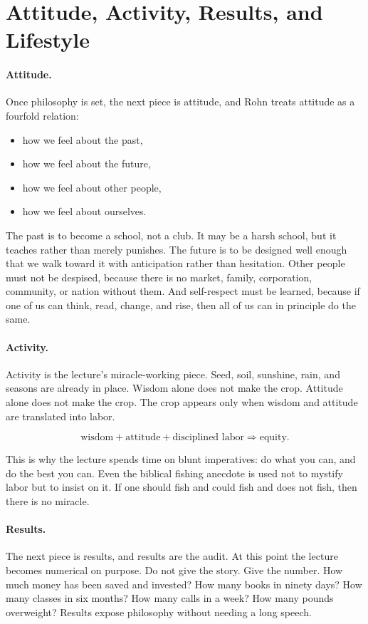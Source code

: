 \section{Attitude, Activity, Results, and Lifestyle}

\paragraph{Attitude.}
Once philosophy is set, the next piece is attitude, and Rohn treats attitude as a fourfold relation:

\begin{itemize}
\item how we feel about the past,
\item how we feel about the future,
\item how we feel about other people,
\item how we feel about ourselves.
\end{itemize}

The past is to become a school, not a club. It may be a harsh school, but it teaches rather than merely punishes. The future is to be designed well enough that we walk toward it with anticipation rather than hesitation. Other people must not be despised, because there is no market, family, corporation, community, or nation without them. And self-respect must be learned, because if one of us can think, read, change, and rise, then all of us can in principle do the same.

\paragraph{Activity.}
Activity is the lecture's miracle-working piece. Seed, soil, sunshine, rain, and seasons are already in place. Wisdom alone does not make the crop. Attitude alone does not make the crop. The crop appears only when wisdom and attitude are translated into labor.

\begin{equation}
\text{wisdom}+\text{attitude}+\text{disciplined labor}\Rightarrow \text{equity}.
\end{equation}

This is why the lecture spends time on blunt imperatives: do what you can, and do the best you can. Even the biblical fishing anecdote is used not to mystify labor but to insist on it. If one should fish and could fish and does not fish, then there is no miracle.

\paragraph{Results.}
The next piece is results, and results are the audit. At this point the lecture becomes numerical on purpose. Do not give the story. Give the number. How much money has been saved and invested? How many books in ninety days? How many classes in six months? How many calls in a week? How many pounds overweight? Results expose philosophy without needing a long speech.

